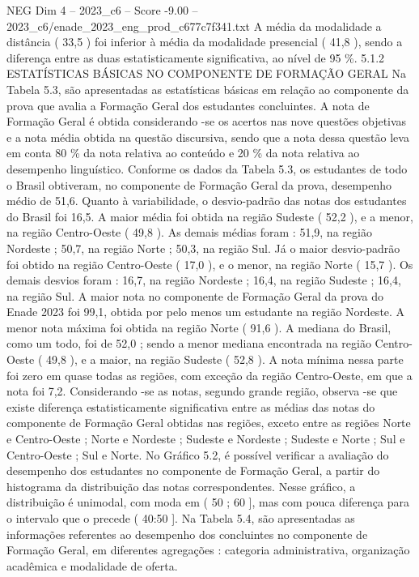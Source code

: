 \begin{textsample}{NEG Dim 4 – 2023\_c6 – Score -9.00 – 2023\_c6/enade\_2023\_eng\_prod\_c677c7f341.txt}
A média da modalidade a distância ( 33,5 ) foi inferior à média da modalidade presencial ( 41,8 ), sendo a diferença entre as duas estatisticamente significativa, ao nível de 95 \%. 5.1.2 ESTATÍSTICAS BÁSICAS NO COMPONENTE DE FORMAÇÃO GERAL Na Tabela 5.3, são apresentadas as estatísticas básicas em relação ao componente da prova que avalia a Formação Geral dos estudantes concluintes.
A nota de Formação Geral é obtida considerando -se os acertos nas nove questões objetivas e a nota média obtida na questão discursiva, sendo que a nota dessa questão leva em conta 80 \% da nota relativa ao conteúdo e 20 \% da nota relativa ao desempenho linguístico.
Conforme os dados da Tabela 5.3, os estudantes de todo o Brasil obtiveram, no componente de Formação Geral da prova, desempenho médio de 51,6.
Quanto à variabilidade, o desvio-padrão das notas dos estudantes do Brasil foi 16,5.
A maior média foi obtida na região Sudeste ( 52,2 ), e a menor, na região Centro-Oeste ( 49,8 ).
As demais médias foram : 51,9, na região Nordeste ; 50,7, na região Norte ; 50,3, na região Sul.
Já o maior desvio-padrão foi obtido na região Centro-Oeste ( 17,0 ), e o menor, na região Norte ( 15,7 ).
Os demais desvios foram : 16,7, na região Nordeste ; 16,4, na região Sudeste ; 16,4, na região Sul.
A maior nota no componente de Formação Geral da prova do Enade 2023 foi 99,1, obtida por pelo menos um estudante na região Nordeste.
A menor nota máxima foi obtida na região Norte ( 91,6 ).
A mediana do Brasil, como um todo, foi de 52,0 ; sendo a menor mediana encontrada na região Centro-Oeste ( 49,8 ), e a maior, na região Sudeste ( 52,8 ).
A nota mínima nessa parte foi zero em quase todas as regiões, com exceção da região Centro-Oeste, em que a nota foi 7,2.
Considerando -se as notas, segundo grande região, observa -se que existe diferença estatisticamente significativa entre as médias das notas do componente de Formação Geral obtidas nas regiões, exceto entre as regiões Norte e Centro-Oeste ; Norte e Nordeste ; Sudeste e Nordeste ; Sudeste e Norte ; Sul e Centro-Oeste ; Sul e Norte.
No Gráfico 5.2, é possível verificar a avaliação do desempenho dos estudantes no componente de Formação Geral, a partir do histograma da distribuição das notas correspondentes.
Nesse gráfico, a distribuição é unimodal, com moda em ( 50 ; 60 ], mas com pouca diferença para o intervalo que o precede ( 40:50 ].
Na Tabela 5.4, são apresentadas as informações referentes ao desempenho dos concluintes no componente de Formação Geral, em diferentes agregações : categoria administrativa, organização acadêmica e modalidade de oferta.

\end{textsample}
